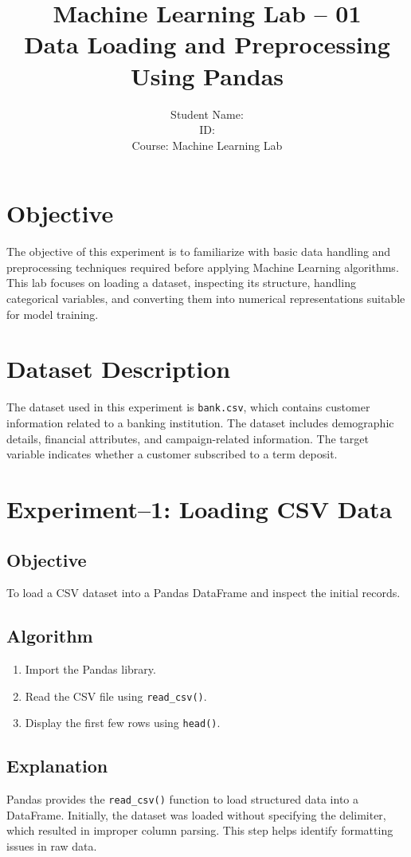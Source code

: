 \documentclass[11pt]{article}
\title{\textbf{Machine Learning Lab -- 01}\\
Data Loading and Preprocessing Using Pandas}
\author{Student Name: \\
ID: \\
Course: Machine Learning Lab}
\date{}
\begin{document}
\maketitle

\section{Objective}
The objective of this experiment is to familiarize with basic data handling and preprocessing techniques required before applying Machine Learning algorithms. This lab focuses on loading a dataset, inspecting its structure, handling categorical variables, and converting them into numerical representations suitable for model training.

\section{Dataset Description}
The dataset used in this experiment is \texttt{bank.csv}, which contains customer information related to a banking institution. The dataset includes demographic details, financial attributes, and campaign-related information. The target variable indicates whether a customer subscribed to a term deposit.

\section{Experiment--1: Loading CSV Data}

\subsection*{Objective}
To load a CSV dataset into a Pandas DataFrame and inspect the initial records.

\subsection*{Algorithm}
\begin{enumerate}
    \item Import the Pandas library.
    \item Read the CSV file using \texttt{read\_csv()}.
    \item Display the first few rows using \texttt{head()}.
\end{enumerate}

\subsection*{Explanation}
Pandas provides the \texttt{read\_csv()} function to load structured data into a DataFrame. Initially, the dataset was loaded without specifying the delimiter, which resulted in improper column parsing. This step helps identify formatting issues in raw data.
\end{document}
